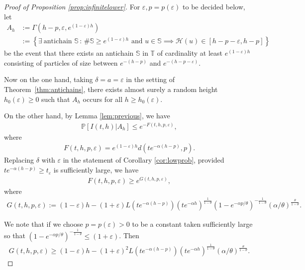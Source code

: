 \documentclass[a4,12pt]{amsart}
\numberwithin{equation}{section}
\begin{document}
	\begin{proof}[Proof of Proposition \ref{prop:infinitelower}]

For $\varepsilon, p = p(\varepsilon)$ to be decided below, let 
    	\begin{align*}
    		A_h &:= \Gamma(h-p,\varepsilon,e^{(1-\varepsilon)h})\\
            &:= \left\{ \exists ~ \text{antichain $\mathbb{S}$} \,:\, 
		\# \mathbb{S} \geq e^{ (1-\varepsilon) h } \text{ and }
	u \in \mathbb{S} \implies \mathcal{H}(u) \in [h-p-\varepsilon,h-p] \right\}
    	\end{align*}
	be the event that there exists an antichain $\mathbb{S}$ in $\mathbb{T}$ 
	of cardinality at least $e^{(1-\varepsilon)h}$ consisting of 
	particles of size between $e^{-(h-p)}$ and $e^{ - (h-p-\varepsilon)}$. 

Now on the one hand, taking $\delta = a = \varepsilon$ in the setting of Theorem~\ref{thm:antichains}, 
	there exists almost surely a random %
	height $h_0(\varepsilon)\geq 0$ such that $A_{h}$ occurs for all $h \geq h_0(\varepsilon)$.

On the other hand, by Lemma \ref{lem:previous}, we have
\begin{align} \label{eq:completa}
\mathbb{P}[ I(t,h) | A_h ] \leq e^{ - F(t,h,p,\varepsilon)},
\end{align}
where
\begin{align*}
F(t,h,p,\varepsilon) = e^{(1-\varepsilon)h} d(te^{ - \alpha(h-p)},p).
\end{align*}
Replacing $\delta$ with $\varepsilon$ in the statement of Corollary \ref{cor:lowprob}, provided $te^{ - \alpha(h-p)} \geq t_\varepsilon$ is sufficiently large, we have
\begin{align} \label{eq:completa2}
F(t,h,p,\varepsilon) \geq e^{ G(t,h,p,\varepsilon)}, 
\end{align}
where
\begin{align*}
G(t,h,p,\varepsilon) := (1-\varepsilon)h - (1+\varepsilon)L(te^{ - \alpha (h-p)}) (t e^{ - \alpha h} )^{ \frac{1}{1-\theta} } (1 - e^{ - \alpha p/\theta})^{ - \frac{1}{1-\theta} } (\alpha/\theta)^{ \frac{\theta}{1-\theta}}.  
\end{align*}

We note that if we choose $p = p(\varepsilon)>0$ to be a constant taken sufficiently large so that $(1 - e^{ - \alpha p /\theta} )^{- \frac{1}{1-\theta}} \leq (1+\varepsilon)$. Then 
\begin{align*}
G(t,h,p,\varepsilon) \geq (1-\varepsilon)h - (1+\varepsilon)^2 L(te^{ - \alpha (h-p)}) (t e^{ - \alpha h} )^{ \frac{1}{1-\theta} } (\alpha/\theta)^{ \frac{\theta}{1-\theta}}.  
\end{align*}


\end{proof}
\end{document}
